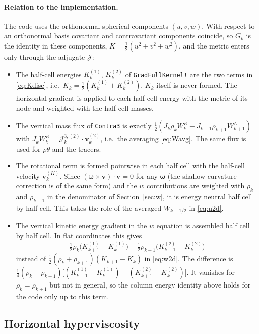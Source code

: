 \documentclass[11pt,a4paper]{article}
\newcommand{\vv}{\bm{v}}
\newcommand{\Jm}{\mathcal{J}}
\newcommand{\code}[1]{\texttt{#1}}
\begin{document}
\paragraph{Relation to the implementation.}
The code uses the orthonormal spherical components $(u,v,w)$. With respect
to an orthonormal basis covariant and contravariant components coincide, so
$G_k$ is the identity in these components, $K = \tfrac12(u^2+v^2+w^2)$, and
the metric enters only through the adjugate $\Jm$:
\begin{itemize}
\item The half-cell energies $K^{(1)}_k$, $K^{(2)}_k$ of
  \code{GradFullKernel!} are the two terms in \eqref{eq:Kdisc}, i.e.\
  $K_k = \tfrac12(K^{(1)}_k + K^{(2)}_k)$. $K_k$ itself is never formed.
  The horizontal gradient is applied to each half-cell energy with the
  metric of its node and weighted with the half-cell masses.
\item The vertical mass flux of \code{Contra3} is exactly
  $\tfrac12(J_k\rho_kW^R_k + J_{k+1}\rho_{k+1}W^L_{k+1})$ with
  $J_kW^R_k = \Jm^{3,(2)}_k\cdot\vv^{(2)}_k$, i.e.\ the averaging
  \eqref{eq:Wavg}. The same flux is used for $\rho\theta$ and the tracers.
\item The rotational term is formed pointwise in each half cell with the
  half-cell velocity $\vv^{(K)}_k$. Since $(\bm\omega\times\vv)\cdot\vv = 0$
  for any $\bm\omega$ (the shallow curvature correction is of the same form) and the
  $w$ contributions are weighted with $\rho_k$ and $\rho_{k+1}$ in the
  denominator of Section~\ref{sec:w}, it is energy neutral half cell by half
  cell. This takes the role of the averaged $W_{k+1/2}$ in \eqref{eq:u2d}.
\item The vertical kinetic energy gradient in the $w$ equation is assembled
  half cell by half cell. In flat coordinates this gives
  \begin{equation}
    \tfrac12\rho_k\bigl(K^{(1)}_{k+1} - K^{(1)}_k\bigr)
    + \tfrac12\rho_{k+1}\bigl(K^{(2)}_{k+1} - K^{(2)}_k\bigr)
  \end{equation}
  instead of $\tfrac12(\rho_k + \rho_{k+1})(K_{k+1} - K_k)$ in
  \eqref{eq:w2d}. The difference is
  $\tfrac14(\rho_k - \rho_{k+1})
   \bigl[(K^{(1)}_{k+1} - K^{(1)}_k) - (K^{(2)}_{k+1} - K^{(2)}_k)\bigr]$.
  It vanishes for $\rho_k = \rho_{k+1}$ but not in general, so the column
  energy identity above holds for the code only up to this term.
\end{itemize}

\subsection{Horizontal hyperviscosity}
\end{document}
